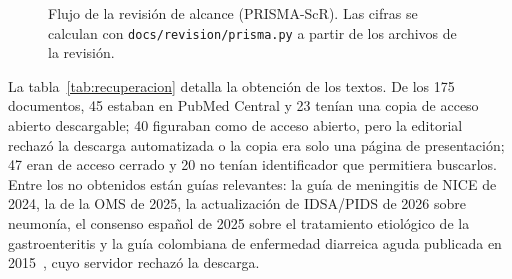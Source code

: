 \documentclass[11pt,a4paper]{article}
\newcommand{\codigo}[1]{\texttt{\small #1}}
\begin{document}
\begin{figure}[htbp]
\caption{Flujo de la revisión de alcance (PRISMA-ScR). Las cifras se calculan con \codigo{docs/revision/prisma.py} a partir de los archivos de la revisión.}
\label{fig:flujo}
\end{figure}

La tabla~\ref{tab:recuperacion} detalla la obtención de los textos. De los 175 documentos, 45 estaban en PubMed Central y 23 tenían una copia de acceso abierto descargable; 40 figuraban como de acceso abierto, pero la editorial rechazó la descarga automatizada o la copia era solo una página de presentación; 47 eran de acceso cerrado y 20 no tenían identificador que permitiera buscarlos. Entre los no obtenidos están guías relevantes: la guía de meningitis de NICE de 2024, la de la OMS de 2025, la actualización de IDSA/PIDS de 2026 sobre neumonía, el consenso español de 2025 sobre el tratamiento etiológico de la gastroenteritis y la guía colombiana de enfermedad diarreica aguda publicada en 2015~\citep{florez2015}, cuyo servidor rechazó la descarga.
\end{document}
